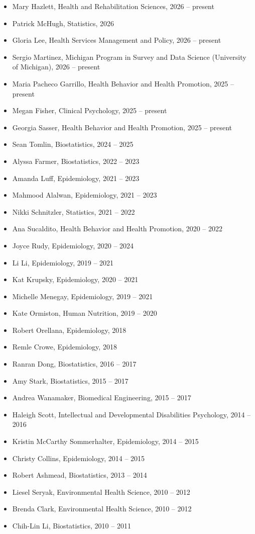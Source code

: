 \documentclass[
  english,
  letterpaper,
  DIV=11,
  numbers=noendperiod]{scrartcl}
\providecommand{\tightlist}{%
  \setlength{\itemsep}{0pt}\setlength{\parskip}{0pt}}
\begin{document}
\begin{itemize}
\tightlist
\item
  Mary Hazlett, Health and Rehabilitation Sciences, 2026 -- present
\item
  Patrick McHugh, Statistics, 2026
\item
  Gloria Lee, Health Services Management and Policy, 2026 -- present
\item
  Sergio Martinez, Michigan Program in Survey and Data Science
  (University of Michigan), 2026 -- present
\item
  Maria Pacheco Garrillo, Health Behavior and Health Promotion, 2025 --
  present
\item
  Megan Fisher, Clinical Psychology, 2025 -- present
\item
  Georgia Sasser, Health Behavior and Health Promotion, 2025 -- present
\item
  Sean Tomlin, Biostatistics, 2024 -- 2025
\item
  Alyssa Farmer, Biostatistics, 2022 -- 2023
\item
  Amanda Luff, Epidemiology, 2021 -- 2023
\item
  Mahmood Alalwan, Epidemiology, 2021 -- 2023
\item
  Nikki Schnitzler, Statistics, 2021 -- 2022
\item
  Ana Sucaldito, Health Behavior and Health Promotion, 2020 -- 2022
\item
  Joyce Rudy, Epidemiology, 2020 -- 2024
\item
  Li Li, Epidemiology, 2019 -- 2021
\item
  Kat Krupsky, Epidemiology, 2020 -- 2021
\item
  Michelle Menegay, Epidemiology, 2019 -- 2021
\item
  Kate Ormiston, Human Nutrition, 2019 -- 2020
\item
  Robert Orellana, Epidemiology, 2018
\item
  Remle Crowe, Epidemiology, 2018
\item
  Ranran Dong, Biostatistics, 2016 -- 2017
\item
  Amy Stark, Biostatistics, 2015 -- 2017
\item
  Andrea Wanamaker, Biomedical Engineering, 2015 -- 2017
\item
  Haleigh Scott, Intellectual and Developmental Disabilities Psychology,
  2014 -- 2016
\item
  Kristin McCarthy Sommerhalter, Epidemiology, 2014 -- 2015
\item
  Christy Collins, Epidemiology, 2014 -- 2015
\item
  Robert Ashmead, Biostatistics, 2013 -- 2014
\item
  Liesel Seryak, Environmental Health Science, 2010 -- 2012
\item
  Brenda Clark, Environmental Health Science, 2010 -- 2012
\item
  Chih-Lin Li, Biostatistics, 2010 -- 2011
\end{itemize}
\end{document}
